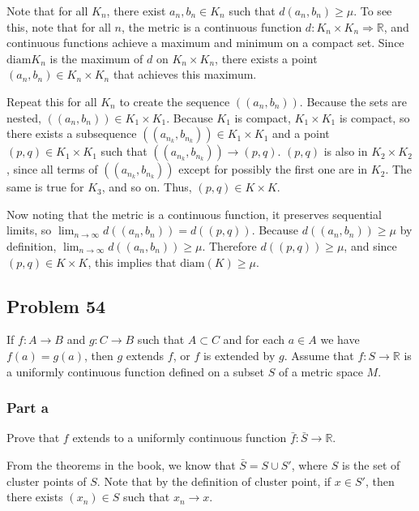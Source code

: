 \documentclass{article}
\newcommand{\diam}{\text{diam}}
\newcommand{\R}{\mathbb{R}}
\begin{document}
Note that for all $K_n$, there exist $a_n, b_n \in K_n$ such that $d(a_n, b_n) \geq \mu$. To see this, note that for all $n$, the metric is a continuous function $d: K_n \times K_n \Rightarrow \R$, and continuous functions achieve a maximum and minimum on a compact set. Since $\diam K_n$ is the maximum of $d$ on $K_n \times K_n$, there exists a point $(a_n, b_n) \in K_n \times K_n$ that achieves this maximum.

Repeat this for all $K_n$ to create the sequence $((a_n, b_n))$. Because the sets are nested, $((a_n, b_n)) \in K_1 \times K_1$. Because $K_1$ is compact, $K_1 \times K_1$ is compact, so there exists a subsequence $((a_{n_k}, b_{n_k})) \in K_1 \times K_1$ and a point $(p, q) \in K_1 \times K_1$ such that $((a_{n_k}, b_{n_k})) \rightarrow (p, q)$. $(p, q)$ is also in $K_2 \times K_2$, since all terms of $((a_{n_k}, b_{n_k}))$ except for possibly the first one are in $K_2$. The same is true for $K_3$, and so on. Thus, $(p, q) \in K \times K$.

Now noting that the metric is a continuous function, it preserves sequential limits, so $\lim_{n \rightarrow \infty} d((a_n, b_n)) = d((p, q))$. Because $d((a_n, b_n)) \geq \mu$ by definition, $\lim_{n \rightarrow \infty} d((a_n, b_n)) \geq \mu$. Therefore $d((p, q)) \geq \mu$, and since $(p, q) \in K \times K$, this implies that $\diam(K) \geq \mu$.

\subsection*{Problem 54}

If $f: A \rightarrow B$ and $g: C \rightarrow B$ such that $A \subset C$ and for each $a \in A$ we have $f(a) = g(a)$, then $g$ extends $f$, or $f$ is extended by $g$. Assume that $f : S \rightarrow \R$ is a uniformly continuous function defined on a subset $S$ of a metric space $M$.

\subsubsection*{Part a}

Prove that $f$ extends to a uniformly continuous function $\bar{f}: \bar{S} \rightarrow \R$.

From the theorems in the book, we know that $\bar{S} = S \cup S'$, where $S$ is the set of cluster points of $S$. Note that by the definition of cluster point, if $x \in S'$, then there exists $(x_n) \in S$ such that $x_n \rightarrow x$.
\end{document}

